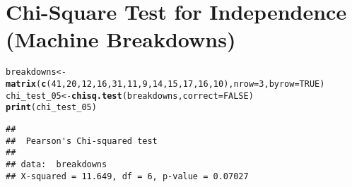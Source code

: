 \documentclass{article}\usepackage[]{graphicx}\usepackage[]{xcolor}
\makeatletter
\newcommand{\hlnum}[1]{\textcolor[rgb]{0.686,0.059,0.569}{#1}}%
\newcommand{\hldef}[1]{\textcolor[rgb]{0.345,0.345,0.345}{#1}}%
\newcommand{\hlkwb}[1]{\textcolor[rgb]{0.69,0.353,0.396}{#1}}%
\newcommand{\hlkwc}[1]{\textcolor[rgb]{0.333,0.667,0.333}{#1}}%
\newcommand{\hlkwd}[1]{\textcolor[rgb]{0.737,0.353,0.396}{\textbf{#1}}}%
\newenvironment{kframe}{%
 \def\at@end@of@kframe{}%
 \ifinner\ifhmode%
  \def\at@end@of@kframe{\end{minipage}}%
  \begin{minipage}{\columnwidth}%
 \fi\fi%
 \def\FrameCommand##1{\hskip\@totalleftmargin \hskip-\fboxsep
 \colorbox{shadecolor}{##1}\hskip-\fboxsep
     \hskip-\linewidth \hskip-\@totalleftmargin \hskip\columnwidth}%
 \MakeFramed {\advance\hsize-\width
   \@totalleftmargin\z@ \linewidth\hsize
   \@setminipage}}%
 {\par\unskip\endMakeFramed%
 \at@end@of@kframe}
\newenvironment{knitrout}{}{} %
\makeatother
\begin{document}
\section{Chi-Square Test for Independence (Machine Breakdowns)}
\begin{knitrout}
\color{fgcolor}\begin{kframe}
\begin{alltt}
\hldef{breakdowns} \hlkwb{<-} \hlkwd{matrix}\hldef{(}\hlkwd{c}\hldef{(}\hlnum{41}\hldef{,} \hlnum{20}\hldef{,} \hlnum{12}\hldef{,} \hlnum{16}\hldef{,} \hlnum{31}\hldef{,} \hlnum{11}\hldef{,} \hlnum{9}\hldef{,} \hlnum{14}\hldef{,} \hlnum{15}\hldef{,} \hlnum{17}\hldef{,} \hlnum{16}\hldef{,} \hlnum{10}\hldef{),} \hlkwc{nrow} \hldef{=} \hlnum{3}\hldef{,} \hlkwc{byrow} \hldef{=} \hlnum{TRUE}\hldef{)}
\hldef{chi_test_05} \hlkwb{<-} \hlkwd{chisq.test}\hldef{(breakdowns,} \hlkwc{correct} \hldef{=} \hlnum{FALSE}\hldef{)}
\hlkwd{print}\hldef{(chi_test_05)}
\end{alltt}
\begin{verbatim}
## 
## 	Pearson's Chi-squared test
## 
## data:  breakdowns
## X-squared = 11.649, df = 6, p-value = 0.07027
\end{verbatim}
\end{kframe}
\end{knitrout}
\end{document}

